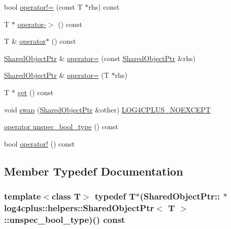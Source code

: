 \begin{DoxyCompactItemize}
bool \hyperlink{classlog4cplus_1_1helpers_1_1SharedObjectPtr_a7d8b6c17c209d84d5229b938e57f689f}{operator!=} (const T $\ast$rhs) const 
\item 
T $\ast$ \hyperlink{classlog4cplus_1_1helpers_1_1SharedObjectPtr_a15218ca193eed036be7faf2bb90da91d}{operator-\/$>$} () const 
\item 
T \& \hyperlink{classlog4cplus_1_1helpers_1_1SharedObjectPtr_a1c168f23910fd089906221e905db23e1}{operator$\ast$} () const 
\item 
\hyperlink{classlog4cplus_1_1helpers_1_1SharedObjectPtr}{Shared\-Object\-Ptr} \& \hyperlink{classlog4cplus_1_1helpers_1_1SharedObjectPtr_a8053d6b0c54d5ce1ac4097c392155ed1}{operator=} (const \hyperlink{classlog4cplus_1_1helpers_1_1SharedObjectPtr}{Shared\-Object\-Ptr} \&rhs)
\item 
\hyperlink{classlog4cplus_1_1helpers_1_1SharedObjectPtr}{Shared\-Object\-Ptr} \& \hyperlink{classlog4cplus_1_1helpers_1_1SharedObjectPtr_ab75963a52da0c01675054abad9f01cc8}{operator=} (T $\ast$rhs)
\item 
T $\ast$ \hyperlink{classlog4cplus_1_1helpers_1_1SharedObjectPtr_a2d50cbea9d979070d2ae7c39a5799963}{get} () const 
\item 
void \hyperlink{classlog4cplus_1_1helpers_1_1SharedObjectPtr_a88a13a62a47ccac180144e79a1e6d68f}{swap} (\hyperlink{classlog4cplus_1_1helpers_1_1SharedObjectPtr}{Shared\-Object\-Ptr} \&other) \hyperlink{config_8hxx_a77d156ef570ca81fe10eb864ea349506}{L\-O\-G4\-C\-P\-L\-U\-S\-\_\-\-N\-O\-E\-X\-C\-E\-P\-T}
\item 
\hyperlink{classlog4cplus_1_1helpers_1_1SharedObjectPtr_acfc2c3ab3d19020bb0b7e99ee212ab82}{operator unspec\-\_\-bool\-\_\-type} () const 
\item 
bool \hyperlink{classlog4cplus_1_1helpers_1_1SharedObjectPtr_a25f1e5e7f92604dbef2a5582245000d3}{operator!} () const 
\end{DoxyCompactItemize}


\subsection{Member Typedef Documentation}
\hypertarget{classlog4cplus_1_1helpers_1_1SharedObjectPtr_a653dc449b10d1397ace2fc3a14eebbe4}{
\subsubsection[{unspec\-\_\-bool\-\_\-type}]{\setlength{\rightskip}{0pt plus 5cm}template$<$class T$>$ typedef T$\ast$(Shared\-Object\-Ptr\-:: $\ast$  {\bf log4cplus\-::helpers\-::\-Shared\-Object\-Ptr}$<$ T $>$\-::unspec\-\_\-bool\-\_\-type)() const }}\label{classlog4cplus_1_1helpers_1_1SharedObjectPtr_a653dc449b10d1397ace2fc3a14eebbe4}


